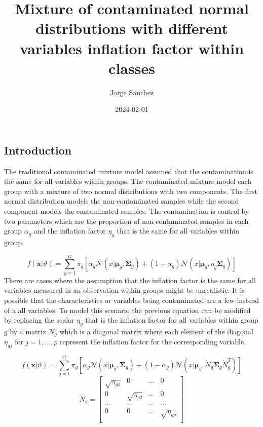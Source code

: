 \documentclass[
]{article}
\title{Mixture of contaminated normal distributions with different
variables inflation factor within classes}
\author{Jorge Sanchez}
\date{2024-02-01}
\begin{document}
\maketitle

\hypertarget{introduction}{%
\subsection{Introduction}\label{introduction}}

The traditional contaminated mixture model assumed that the
contamination is the same for all variables within groups. The
contaminated mixture model each group with a mixture of two normal
distributions with two components. The first normal distribution models
the non-contaminated samples while the second component models the
contaminated samples. The contamination is control by two parameters
which are the proportion of non-contaminated samples in each group
\(\alpha_{g}\) and the inflation factor \(\eta_{g}\) that is the same
for all variables within group.

\[
    f(\mathbf{x}|\vartheta) = \sum^{G}_{g=1} \pi_{g} \left[\alpha_{g} \mathcal{N}(x|\boldsymbol{\mu}_{g},\boldsymbol{\Sigma}_{g})  + (1-\alpha_{g})\mathcal{N}(x|\boldsymbol{\mu}_{g},\eta_{g}\boldsymbol{\Sigma}_{g}) \right]
\] There are cases where the assumption that the inflation factor is the
same for all variables measured in an observation within groups might be
unrealistic. It is possible that the characteristics or variables being
contaminated are a few instead of a all variables. To model this
scenario the previous equation can be modified by replacing the scalar
\(\eta_{g}\) that is the inflation factor for all variables within group
\(g\) by a matrix \(N_{g}\) which is a diagonal matrix where each
element of the diagonal \(\eta_{gj}\) for \(j = 1,\dots,p\) represent
the inflation factor for the corresponding variable.

\[
    f(\mathbf{x}|\vartheta) = \sum^{G}_{g=1} \pi_{g} \left[\alpha_{g} \mathcal{N}(x|\boldsymbol{\mu}_{g},\boldsymbol{\Sigma}_{g})  + (1-\alpha_{g})\mathcal{N}(x|\boldsymbol{\mu}_{g},\dot{N}_{g}\boldsymbol{\Sigma}_{g}\dot{N}^{T}_{g}) \right]
\] \[
\dot{N}_{g} = \begin{bmatrix}
\sqrt{\eta_{g1}} &     0     & \dots     & 0         \\
0         & \sqrt{\eta_{g2}} & \dots     & 0         \\      
\dots     & \dots     & \dots     & \dots     \\
0         &     0     & \dots     & \sqrt{\eta_{gp}} \\   
\end{bmatrix}
\]
\end{document}
